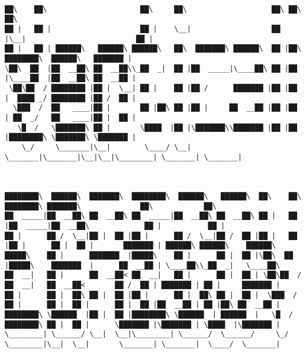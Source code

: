 \documentclass[varwidth=\maxdimen,margin=0.5cm,multi={verbatim}]{standalone}
\begin{document}
\begin{verbatim}

██\    ██\                      ██\     ██\                    ██\ ██\                           ██\
██ |   ██ |                     ██ |    \__|                   ██ |\__|                          ██ |
██ |   ██ | ██████\   ██████\ ██████\   ██\  ███████\ ██████\  ██ |██\ ████████\  ██████\   ███████ |
\██\  ██  |██  __██\ ██  __██\\_██  _|  ██ |██  _____|\____██\ ██ |██ |\____██  |██  __██\ ██  __██ |
 \██\██  / ████████ |██ |  \__| ██ |    ██ |██ /      ███████ |██ |██ |  ████ _/ ████████ |██ /  ██ |
  \███  /  ██   ____|██ |       ██ |██\ ██ |██ |     ██  __██ |██ |██ | ██  _/   ██   ____|██ |  ██ |
   \█  /   \███████\ ██ |       \████  |██ |\███████\\███████ |██ |██ |████████\ \███████\ \███████ |
    \_/     \_______|\__|        \____/ \__| \_______|\_______|\__|\__|\________| \_______| \_______|



████████\  ██████\  ███████\  ████████\  ██████\   ██████\  ██\    ██\ ████████\ ███████\              ██\            ██\
██  _____|██  __██\ ██  __██\ ██  _____|██  __██\ ██  __██\ ██ |   ██ |██  _____|██  __██\             ██ |           ██ |
██ |      ██ /  \__|██ |  ██ |██ |      ██ /  \__|██ /  ██ |██ |   ██ |██ |      ██ |  ██ |       ███████ | ██████\ ██████\    ██████\
█████\    ██ |      ███████  |█████\    ██ |      ██ |  ██ |\██\  ██  |█████\    ███████  |      ██  __██ | \____██\\_██  _|   \____██\
██  __|   ██ |      ██  __██< ██  __|   ██ |      ██ |  ██ | \██\██  / ██  __|   ██  __██<       ██ /  ██ | ███████ | ██ |     ███████ |
██ |      ██ |  ██\ ██ |  ██ |██ |      ██ |  ██\ ██ |  ██ |  \███  /  ██ |      ██ |  ██ |      ██ |  ██ |██  __██ | ██ |██\ ██  __██ |
████████\ \██████  |██ |  ██ |████████\ \██████  | ██████  |   \█  /   ████████\ ██ |  ██ |      \███████ |\███████ | \████  |\███████ |
\________| \______/ \__|  \__|\________| \______/  \______/     \_/    \________|\__|  \__|       \_______| \_______|  \____/  \_______|





\end{verbatim}
\end{document}
